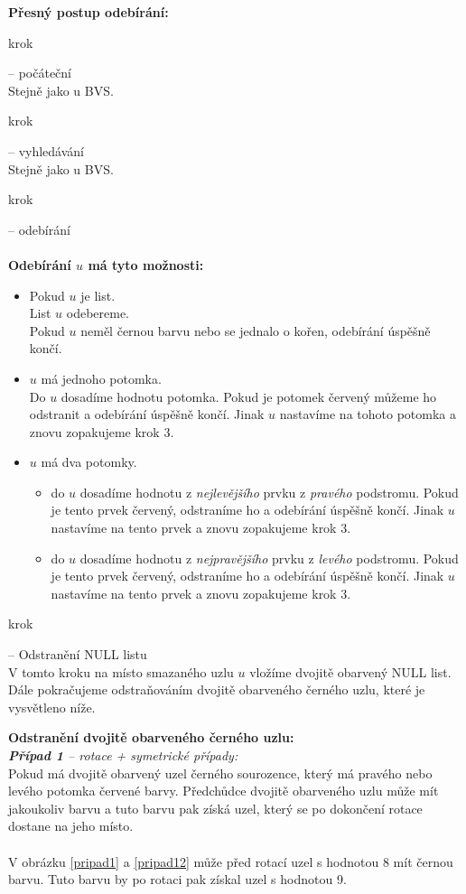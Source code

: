 \documentclass[
  biblatex=false,
  font=serif,
  glossaries=false,
  tables=false,
  theorems=false,
  index
]{kidiplom}
\begin{document}
\noindent \textbf{Přesný postup odebírání:}
\begin{enumerate} {\bfseries
\item  krok} -- počáteční \\
Stejně jako u BVS.
{\bfseries\item  krok} -- vyhledávání \\
Stejně jako u BVS.
{\bfseries\item  krok} -- odebírání \\\\
\textbf{Odebírání $u$ má tyto možnosti:}
\begin{itemize}
\item Pokud $u$ je list. \\
List $u$ odebereme.\\
Pokud $u$ neměl černou barvu nebo se jednalo o kořen, odebírání úspěšně končí.
\item $u$ má jednoho potomka. \\
Do $u$ dosadíme hodnotu potomka. Pokud je potomek červený můžeme ho odstranit a odebírání úspěšně končí. Jinak $u$ nastavíme na tohoto potomka a znovu zopakujeme krok 3.
\item $u$ má dva potomky. 
\begin{itemize}
\item do $u$ dosadíme hodnotu z \textit{nejlevějšího} prvku z \textit{pravého} podstromu. Pokud je tento prvek červený, odstraníme ho a odebírání úspěšně končí. Jinak $u$ nastavíme na tento prvek a znovu zopakujeme krok 3.
\item do $u$ dosadíme hodnotu z \textit{nejpravějšího} prvku z \textit{levého} podstromu. Pokud je tento prvek červený, odstraníme ho a odebírání úspěšně končí. Jinak $u$ nastavíme na tento prvek a znovu zopakujeme krok 3.
\end{itemize}
\end{itemize}
{\bfseries\item  krok} -- Odstranění NULL listu \\
V tomto kroku na místo smazaného uzlu $u$ vložíme dvojitě obarvený NULL list. Dále pokračujeme odstraňováním dvojitě obarveného černého uzlu, které je vysvětleno níže.
\end{enumerate}

\newpage
\noindent \textbf{Odstranění dvojitě obarveného černého uzlu:}\\

\noindent \textit{\textbf{Případ 1} -- rotace + symetrické případy:}\\
Pokud má dvojitě obarvený uzel černého sourozence, který má pravého nebo levého potomka červené barvy. Předchůdce dvojitě obarveného uzlu může mít jakoukoliv barvu a tuto barvu pak získá uzel, který se po dokončení rotace dostane na jeho místo.\\\\
V obrázku \ref{pripad1} a \ref{pripad12} může před rotací uzel s hodnotou 8 mít černou barvu. Tuto barvu by po rotaci pak získal uzel s hodnotou 9.
\end{document}
